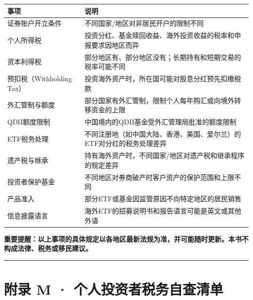 \documentclass[a4paper,11pt,oneside,fontset=none,UTF8,zihao=-4]{ctexbook}
\begin{document}
\begin{longtable}[]{@{}
  >{\raggedright\arraybackslash}p{}
  >{\raggedright\arraybackslash}p{}@{}}
\toprule\noalign{}\rowcolor{dh-pink!25}
\begin{minipage}[b]{\linewidth}\raggedright
事项
\end{minipage} & \begin{minipage}[b]{\linewidth}\raggedright
说明
\end{minipage} \\
\midrule\noalign{}
\endhead
\bottomrule\noalign{}
\endlastfoot
证券账户开立条件 & 不同国家/地区对非居民开户的限制不同 \\
个人所得税 &
投资分红、基金赎回收益、海外投资收益的税率和申报要求因地区而异 \\
资本利得税 &
部分地区有、部分地区没有；长期持有和短期交易的税率可能不同 \\
预扣税（Withholding Tax） &
投资海外资产时，所在国可能对股息分红预先扣缴税款 \\
外汇管制与额度 &
部分国家有外汇管制，限制个人每年购汇或向境外转移资金的上限 \\
QDII额度限制 & 中国境内的QDII基金受外汇管理局批准的额度限制 \\
ETF税务处理 &
不同注册地（如中国大陆、香港、美国、爱尔兰）的ETF对分红的税务处理差异 \\
遗产税与继承 &
持有海外资产时，不同国家/地区对遗产税和继承程序的规定差异 \\
投资者保护基金 & 不同地区对券商破产时客户资产的保护范围和上限不同 \\
产品准入 & 部分ETF或基金因监管原因不向特定地区的居民销售 \\
信息披露语言 & 海外ETF的招募说明书和报告语言可能是英文或其他外语 \\
\end{longtable}

\begin{dhquote}
\textbf{重要提醒：以上事项的具体规定以各地区最新法规为准，并可能随时更新。本书不构成法律、税务或移民建议。}
\end{dhquote}

\begin{center}{\color{dh-bronze}\rule{0.2\textwidth}{0.5pt}}\end{center}

\section{附录 M ·
个人投资者税务自查清单}\label{ux9644ux5f55-m-ux4e2aux4ebaux6295ux8d44ux8005ux7a0eux52a1ux81eaux67e5ux6e05ux5355}
\end{document}
